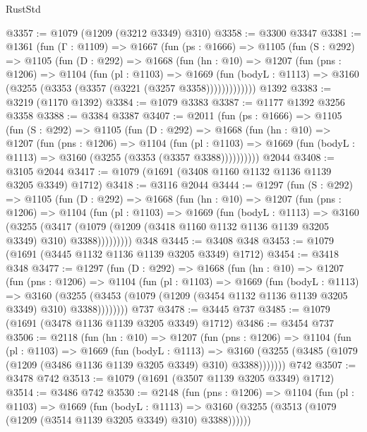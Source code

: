 \begin{lexlean}{RustStd}
\begin{coremodule}
{\begin{coremodule}
{{{{{{{{{{@3357 := @1079 (@1209 (@3212 @3349) @310)
@3358 := @3300 @3347
@3381 := @1361
    (fun (Γ : @1109) =>
    @1667
      (fun (ps : @1666) =>
      @1105
        (fun (S : @292) =>
        @1105
          (fun (D : @292) =>
          @1668
            (fun (hn : @10) =>
            @1207
              (fun (pns : @1206) =>
              @1104
                (fun (pl : @1103) =>
                @1669
                  (fun (bodyL : @1113) =>
                  @3160 (@3255 (@3353 (@3357 (@3221 (@3257 @3358)))))))))))))
    @1392
@3383 := @3219 (@1170 @1392)
@3384 := @1079 @3383
@3387 := @1177 @1392 @3256 @3358
@3388 := @3384 @3387
@3407 := @2011
    (fun (ps : @1666) =>
    @1105
      (fun (S : @292) =>
      @1105
        (fun (D : @292) =>
        @1668
          (fun (hn : @10) =>
          @1207
            (fun (pns : @1206) =>
            @1104
              (fun (pl : @1103) =>
              @1669 (fun (bodyL : @1113) => @3160 (@3255 (@3353 (@3357 @3388))))))))))
    @2044
@3408 := @3105 @2044
@3417 := @1079 (@1691 (@3408 @1160 @1132 @1136 @1139 @3205 @3349) @1712)
@3418 := @3116 @2044
@3444 := @1297
    (fun (S : @292) =>
    @1105
      (fun (D : @292) =>
      @1668
        (fun (hn : @10) =>
        @1207
          (fun (pns : @1206) =>
          @1104
            (fun (pl : @1103) =>
            @1669
              (fun (bodyL : @1113) =>
              @3160
                (@3255
                  (@3417
                    (@1079 (@1209 (@3418 @1160 @1132 @1136 @1139 @3205 @3349) @310) @3388)))))))))
    @348
@3445 := @3408 @348
@3453 := @1079 (@1691 (@3445 @1132 @1136 @1139 @3205 @3349) @1712)
@3454 := @3418 @348
@3477 := @1297
    (fun (D : @292) =>
    @1668
      (fun (hn : @10) =>
      @1207
        (fun (pns : @1206) =>
        @1104
          (fun (pl : @1103) =>
          @1669
            (fun (bodyL : @1113) =>
            @3160
              (@3255 (@3453 (@1079 (@1209 (@3454 @1132 @1136 @1139 @3205 @3349) @310) @3388))))))))
    @737
@3478 := @3445 @737
@3485 := @1079 (@1691 (@3478 @1136 @1139 @3205 @3349) @1712)
@3486 := @3454 @737
@3506 := @2118
    (fun (hn : @10) =>
    @1207
      (fun (pns : @1206) =>
      @1104
        (fun (pl : @1103) =>
        @1669
          (fun (bodyL : @1113) =>
          @3160 (@3255 (@3485 (@1079 (@1209 (@3486 @1136 @1139 @3205 @3349) @310) @3388)))))))
    @742
@3507 := @3478 @742
@3513 := @1079 (@1691 (@3507 @1139 @3205 @3349) @1712)
@3514 := @3486 @742
@3530 := @2148
    (fun (pns : @1206) =>
    @1104
      (fun (pl : @1103) =>
      @1669
        (fun (bodyL : @1113) =>
        @3160 (@3255 (@3513 (@1079 (@1209 (@3514 @1139 @3205 @3349) @310) @3388))))))
}}}}}}}}}}
\end{coremodule}}
\end{coremodule}
\end{lexlean}
